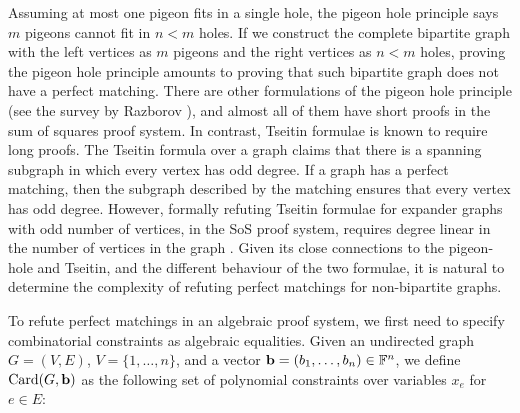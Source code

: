 \documentclass[11pt]{article}
\begin{document}
Assuming at most one pigeon fits in a single hole, the pigeon hole principle says $m$ pigeons cannot fit in $n < m$ holes.
If we construct the complete bipartite graph with the left vertices as $m$ pigeons and the right vertices as $n < m$ holes, proving the pigeon hole principle amounts to proving that such bipartite graph does not have a perfect matching.
There are other formulations of the pigeon hole principle (see the survey by Razborov \citep{razbarov2002pgp}), and almost all of them have short proofs in the sum of squares proof system.
In contrast, Tseitin formulae is known to require long proofs. The Tseitin formula over a graph claims that there is a spanning subgraph in which every vertex has odd degree.
If a graph has a perfect matching, then the subgraph described by the matching ensures that every vertex has odd degree.
However, formally refuting Tseitin formulae for expander graphs with odd number of vertices, in the SoS proof system, requires degree linear in the number of vertices in the graph \cite{grigoriev2001linear}.
Given its close connections to the pigeon-hole and Tseitin, and the different behaviour of the two formulae, it is natural to determine the complexity of refuting perfect matchings for non-bipartite graphs.

To refute perfect matchings in an algebraic proof system, we first need to specify combinatorial constraints as algebraic equalities. Given an undirected graph $G=(V,E)$, $V = \{1, \ldots, n\}$, and a vector $\mathbf{b} = (b_1, \ldots, b_{n}) \in \mathbb{F}^{n}$,
we define $\text{Card}(G, \mathbf{b})$ as the following set of polynomial constraints over variables $x_e$ for $e \in E$:
\end{document}
